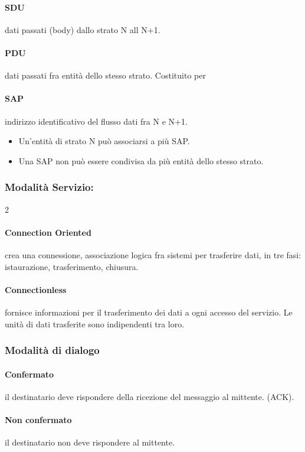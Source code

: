 \paragraph{SDU} dati passati (body) dallo strato N all N+1.
\paragraph{PDU} dati passati fra entità dello stesso strato. Costituito per
\paragraph{SAP} indirizzo identificativo del flusso dati fra N e N+1.
\begin{itemize}
	\item Un'entità di strato N può associarsi a più SAP.
	\item Una SAP non può essere condivisa da più entità dello stesso strato.
\end{itemize}
\subsubsection{Modalità Servizio:}
\begin{paracol}{2}
	\paragraph{Connection Oriented} crea una connessione, associazione logica fra sistemi per trasferire dati, in tre fasi: istaurazione, trasferimento, chiusura.
	\switchcolumn
	\paragraph{Connectionless} fornisce informazioni per il trasferimento dei dati a ogni accesso del servizio. Le unità di dati trasferite sono indipendenti tra loro.
\end{paracol}
\subsubsection{Modalità di dialogo}
\paragraph{Confermato} il destinatario deve rispondere della ricezione del messaggio al mittente. (ACK).
\paragraph{Non confermato} il destinatario non deve rispondere al mittente.
